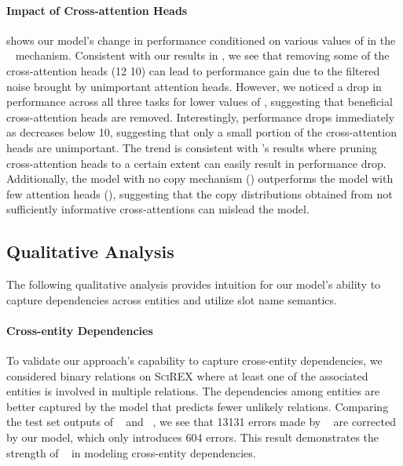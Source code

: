 \documentclass[11pt]{article}
\begin{document}
\paragraph{Impact of  Cross-attention Heads}
 shows our model's change in performance conditioned on various values of  in the \topkcopy~ mechanism. Consistent with our results in , we see that removing some of the cross-attention heads (12  10) can lead to performance gain due to the filtered noise brought by unimportant attention heads. However, we noticed a drop in performance across all three tasks for lower values of , suggesting that beneficial cross-attention heads are removed. Interestingly, performance drops immediately as  decreases below 10, suggesting that only a small portion of the cross-attention heads are unimportant. The trend is consistent with \citet{NEURIPS2019_2c601ad9}'s results where
pruning cross-attention heads to a certain extent can easily result in performance drop. Additionally, the model with no copy mechanism () outperforms the model with few attention heads (), suggesting that the copy distributions obtained from not sufficiently informative cross-attentions can mislead the model.


\subsection{Qualitative Analysis}
The following qualitative analysis provides intuition for our model's ability to capture dependencies across entities and utilize slot name semantics. 

\paragraph{Cross-entity Dependencies} To validate our approach's capability to capture cross-entity dependencies, we considered binary relations on \textsc{SciREX} where at least one of the associated entities is involved in multiple relations. The dependencies among entities are better captured by the model that predicts fewer unlikely relations. Comparing the test set outputs of \modelshort~ and \scirexpipeline~, we see that 13131 errors made by \scirexpipeline~ are corrected by our model, which only introduces 604 errors. This result demonstrates the strength of \modelshort~ in modeling cross-entity dependencies.
\end{document}
